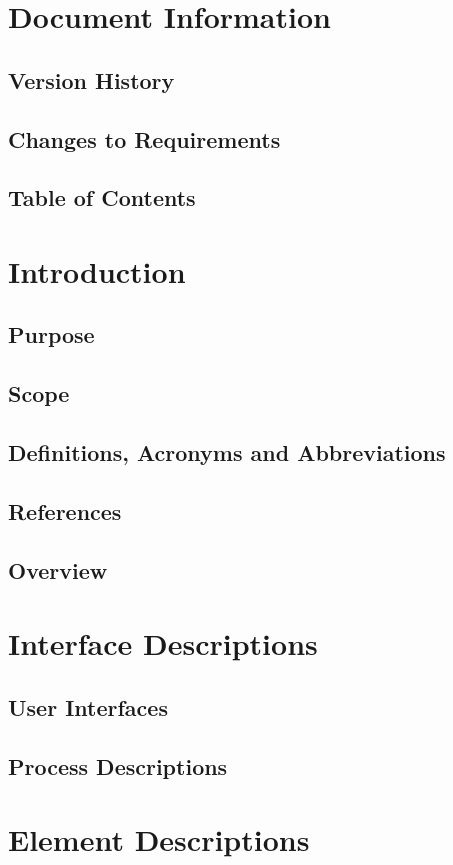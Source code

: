 \documentclass[a4paper,12pt,twoside]{article}
\begin{document}

\setcounter{section}{-1}
\section{Document Information}
\subsection{Version History}
\lipsum[1-2]
\subsection{Changes to Requirements}
\lipsum[3-5]
\newpage
\subsection{Table of Contents}
\tableofcontents
\newpage
\section{Introduction}
\subsection{Purpose}
\lipsum[41-60]
\subsection{Scope}
\lipsum[61-80]
\subsection{Definitions, Acronyms and Abbreviations}
\lipsum[81-100]
\subsection{References}
\lipsum[101-120]
\subsection{Overview}
\lipsum[121-140]
\newpage
\section{Interface Descriptions}
\subsection{User Interfaces}
\lipsum[141-160]
\subsection{Process Descriptions}
\lipsum[61-80]
\newpage
\section{Element Descriptions}


\end{document}
